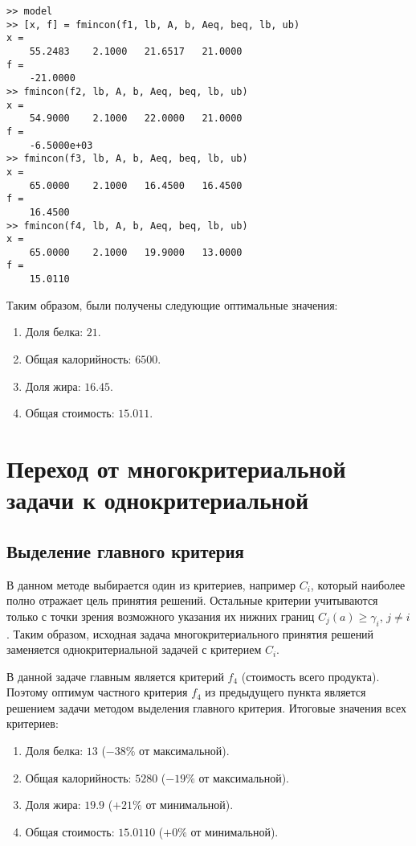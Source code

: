 

\begin{lstlisting}[caption=\code{Console}]
>> model
>> [x, f] = fmincon(f1, lb, A, b, Aeq, beq, lb, ub)
x =
	55.2483    2.1000   21.6517   21.0000
f =
	-21.0000
>> fmincon(f2, lb, A, b, Aeq, beq, lb, ub)
x =
	54.9000    2.1000   22.0000   21.0000
f =
	-6.5000e+03
>> fmincon(f3, lb, A, b, Aeq, beq, lb, ub)
x =
	65.0000    2.1000   16.4500   16.4500
f =
	16.4500
>> fmincon(f4, lb, A, b, Aeq, beq, lb, ub)
x =
	65.0000    2.1000   19.9000   13.0000
f =
	15.0110
\end{lstlisting}

Таким образом, были получены следующие оптимальные значения:

\begin{enumerate}
	\item Доля белка: $21$.
	\item Общая калорийность: $6500$.
	\item Доля жира: $16.45$.
	\item Общая стоимость: $15.011$.
\end{enumerate}

\section{Переход от многокритериальной задачи к однокритериальной}

\subsection{Выделение главного критерия}

В данном методе выбирается один из критериев, например $C_i$, который наиболее полно отражает цель принятия решений. Остальные критерии учитываются только с точки зрения возможного указания их нижних границ $C_j(a) \geq \gamma_i$, $j \neq i$. Таким образом, исходная задача многокритериального принятия решений заменяется однокритериальной задачей с критерием $C_i$.

В данной задаче главным является критерий $f_4$ (стоимость всего продукта). Поэтому оптимум частного критерия $f_4$ из предыдущего пункта является решением задачи методом выделения главного критерия. Итоговые значения всех критериев:

\begin{enumerate}
	\item Доля белка: $13$ ($-38\%$ от максимальной).
	\item Общая калорийность: $5280$ ($-19\%$ от максимальной).
	\item Доля жира: $19.9$ ($+21\%$ от минимальной).
	\item Общая стоимость: $15.0110$ ($+0\%$ от минимальной).
\end{enumerate}

